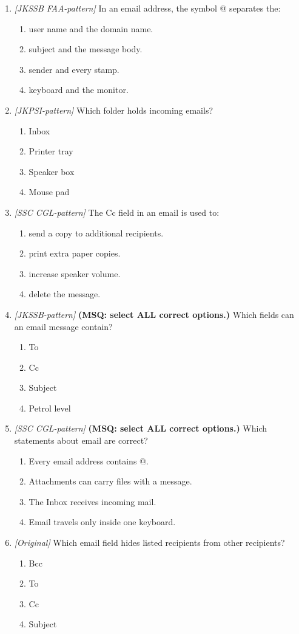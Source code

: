 \begin{enumerate}[label=\textbf{Q\arabic*.}, leftmargin=*]
\item \textit{[JKSSB FAA-pattern]} In an email address, the symbol @ separates the:
  \begin{enumerate}[label=\Alph*.]
    \item user name and the domain name.
    \item subject and the message body.
    \item sender and every stamp.
    \item keyboard and the monitor.
  \end{enumerate}
\item \textit{[JKPSI-pattern]} Which folder holds incoming emails?
  \begin{enumerate}[label=\Alph*.]
    \item Inbox
    \item Printer tray
    \item Speaker box
    \item Mouse pad
  \end{enumerate}
\item \textit{[SSC CGL-pattern]} The Cc field in an email is used to:
  \begin{enumerate}[label=\Alph*.]
    \item send a copy to additional recipients.
    \item print extra paper copies.
    \item increase speaker volume.
    \item delete the message.
  \end{enumerate}
\item \textit{[JKSSB-pattern]} \textbf{(MSQ: select ALL correct options.)} Which fields can an email message contain?
  \begin{enumerate}[label=\Alph*.]
    \item To
    \item Cc
    \item Subject
    \item Petrol level
  \end{enumerate}
\item \textit{[SSC CGL-pattern]} \textbf{(MSQ: select ALL correct options.)} Which statements about email are correct?
  \begin{enumerate}[label=\Alph*.]
    \item Every email address contains @.
    \item Attachments can carry files with a message.
    \item The Inbox receives incoming mail.
    \item Email travels only inside one keyboard.
  \end{enumerate}
\item \textit{[Original]} Which email field hides listed recipients from other recipients?
  \begin{enumerate}[label=\Alph*.]
\item Bcc
   \item To
   \item Cc
   \item Subject
  \end{enumerate}


\end{enumerate}
